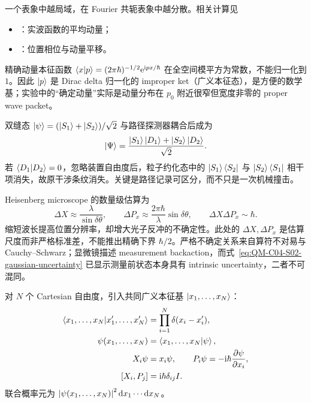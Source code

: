 一个表象中越局域，在 Fourier 共轭表象中越分散。相关计算见
\begin{itemize}[leftmargin=*]
  \item {}：实波函数的平均动量；
  \item {}：位置相位与动量平移。
\end{itemize}

精确动量本征函数 $\left\langle x \middle| p \right\rangle=(2\pi\hbar)^{-1/2}\mathrm{e}^{\mathrm{i} px/\hbar}$ 在全空间模平方为常数，不能归一化到 $1$。因此 $\left|p\right\rangle$ 是 Dirac delta 归一化的 improper ket（广义本征态），是方便的数学基；实验中的“确定动量”实际是动量分布在 $p_0$ 附近很窄但宽度非零的 proper wave packet。



双缝态 $\left|\psi\right\rangle=(\left|S_1\right\rangle+\left|S_2\right\rangle)/\sqrt2$ 与路径探测器耦合后成为
\begin{equation}
  \left|\Psi\right\rangle
  =\frac{\left|S_1\right\rangle\left|D_1\right\rangle+\left|S_2\right\rangle\left|D_2\right\rangle}{\sqrt2}.
  \label{eq:QM-C04-S02-which-path-entanglement}
\end{equation}
若 $\left\langle D_1 \middle| D_2 \right\rangle=0$，忽略装置自由度后，粒子约化态中的 $\left|S_1\right\rangle\left\langle S_2\right|$ 与 $\left|S_2\right\rangle\left\langle S_1\right|$ 相干项消失，故原干涉条纹消失。关键是路径记录可区分，而不只是一次机械撞击。

Heisenberg microscope 的数量级估算为
\begin{equation}
  \Delta X\approx\frac{\lambda}{\sin\delta\theta},
  \qquad
  \Delta P_x\approx
    \frac{2\pi\hbar}{\lambda}\sin\delta\theta,
  \qquad
  \Delta X\Delta P_x\sim\hbar.
  \label{eq:QM-C04-S02-heisenberg-microscope}
\end{equation}
缩短波长提高位置分辨率，却增大光子反冲的不确定性。此处的 $\Delta X,\Delta P_x$ 是估算尺度而非严格标准差，不能推出精确下界 $\hbar/2$。严格不确定关系来自算符不对易与 Cauchy--Schwarz；显微镜描述 measurement backaction，而式~\eqref{eq:QM-C04-S02-gaussian-uncertainty} 已显示测量前状态本身具有 intrinsic uncertainty，二者不可混同。

对 $N$ 个 Cartesian 自由度，引入共同广义本征基 $\left|x_1,\ldots,x_N\right\rangle$：
\begin{align}
  \left\langle x_1,\ldots,x_N \middle| x_1',\ldots,x_N' \right\rangle
  &=\prod_{i=1}^{N}\delta(x_i-x_i'),
  \label{eq:QM-C04-S02-multidimensional-delta}\\
  \psi(x_1,\ldots,x_N)
  &=\left\langle x_1,\ldots,x_N \middle| \psi \right\rangle,
  \label{eq:QM-C04-S02-multidimensional-wavefunction}\\
  X_i\psi&=x_i\psi,
  \qquad
  P_i\psi=-\mathrm{i}\hbar\frac{\partial\psi}{\partial x_i},
  \label{eq:QM-C04-S02-multidimensional-actions}\\
  \left[X_i,P_j\right]&=\mathrm{i}\hbar\delta_{ij}I.
  \label{eq:QM-C04-S02-multidimensional-commutator}
\end{align}
联合概率元为 $\left|\psi(x_1,\ldots,x_N)\right|^2\mathop{}\!\mathrm{d} x_1\cdots\mathop{}\!\mathrm{d} x_N$。

